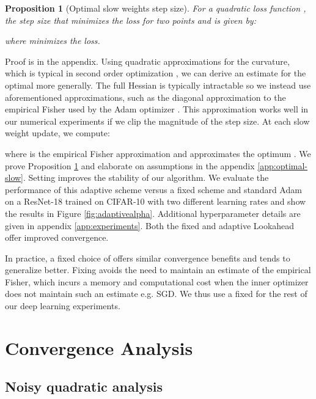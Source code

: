 \documentclass{article}
\newtheorem{proposition}{Proposition}
\begin{document}
\begin{proposition}[Optimal slow weights step size]
\label{prop:optimal-step-size}
For a quadratic loss function , 
the step size  that minimizes the loss for two points  and  is given by:

where  minimizes the loss.
\end{proposition}
Proof is in the appendix. Using quadratic approximations for the curvature, which is typical in second order optimization \citep{duchi2011adaptive, kingma2014adam, martens2015optimizing}, we can derive an estimate for the optimal  more generally. The full Hessian is typically intractable so we instead use aforementioned approximations, such as the diagonal approximation to the empirical Fisher used by the Adam optimizer \citep{kingma2014adam}. This approximation works well in our numerical experiments if we clip the magnitude of the step size. At each slow weight update, we compute:






 where  is the empirical Fisher approximation and  approximates the optimum . We prove Proposition \ref{prop:optimal-step-size} and elaborate on assumptions in the appendix \ref{app:optimal-slow}. Setting  improves the stability of our algorithm. We evaluate the performance of this adaptive scheme versus a fixed scheme and standard Adam on a ResNet-18 trained on CIFAR-10 with two different learning rates and show the results in Figure \ref{fig:adaptivealpha}. Additional hyperparameter details are given in appendix \ref{app:experiments}. Both the fixed and adaptive Lookahead offer improved convergence.

In practice, a fixed choice of  offers similar convergence benefits and tends to generalize better. Fixing  avoids the need to maintain an estimate of the empirical Fisher, which incurs a memory and computational cost when the inner optimizer does not maintain such an estimate e.g. SGD. We thus use a fixed  for the rest of our deep learning experiments. 







    

 \section{Convergence Analysis}

\subsection{Noisy quadratic analysis}
\label{sec: noisyquadratic}
\end{document}
